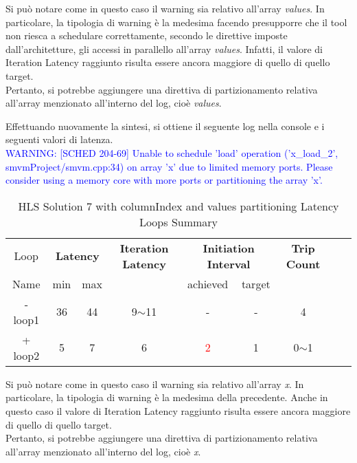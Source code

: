 Si può notare come in questo caso il warning sia relativo all'array \textit{values}. In particolare, la tipologia di warning è la medesima facendo presupporre che il tool non riesca a schedulare correttamente, secondo le direttive imposte dall'architetture, gli accessi in parallello all'array \textit{values}. Infatti, il valore di Iteration Latency raggiunto risulta essere ancora maggiore di quello di quello target. 
\\
Pertanto, si potrebbe aggiungere una direttiva di partizionamento relativa all'array menzionato all'interno del log, cioè \textit{values}.



Effettuando nuovamente la sintesi, si ottiene il seguente log nella console e i seguenti valori di latenza.
\\
\textcolor{blue}{WARNING: [SCHED 204-69] Unable to schedule 'load' operation ('x\_load\_2', smvmProject/smvm.cpp:34) on array 'x' due to limited memory ports. Please consider using a memory core with more ports or partitioning the array 'x'.}

\begin{table}[H]
	\centering
	\begin{tabular}{|c|c|c|c|c|c|c|c|c|}
		\hline
		\multicolumn{1}{|c|}{Loop} & \multicolumn{2}{|c|}{\textbf{Latency}} & \multicolumn{1}{c|}{\textbf{Iteration Latency}} & \multicolumn{2}{c|}{\textbf{Initiation Interval}} & \multicolumn{1}{c|}{\textbf{Trip Count}}  \\
		Name & min & max &  & achieved & target &  \\
		\hline
		- loop1 & 36 & 44 & 9$\sim$11 & - & - & 4 \\
		+ loop2 & 5 & 7 & 6 & \textcolor{red}{2} & 1 & 0$\sim$1 \\
		\hline
	\end{tabular}
	\caption{HLS Solution 7 with columnIndex and values partitioning Latency Loops Summary}
	\label{tab:hls-solution-7-columnindex-values-partitioning-loop-summary}
\end{table}

Si può notare come in questo caso il warning sia relativo all'array \textit{x}. In particolare, la tipologia di warning è la medesima della precedente. Anche in questo caso il valore di Iteration Latency raggiunto risulta essere ancora maggiore di quello di quello target. 
\\
Pertanto, si potrebbe aggiungere una direttiva di partizionamento relativa all'array menzionato all'interno del log, cioè \textit{x}.

